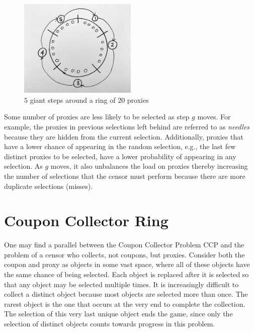 \begin{figure}[h!]
\centering
     \includegraphics[width=0.5\textwidth]{fig/giant_step_ring.png}
    \caption{$5$ giant steps around a ring of $20$ proxies}

    \label{fig:giantstepring}
\end{figure}

Some number of proxies are less likely to be selected as step $g$ moves. For example, the proxies in previous selections left behind are referred to as \emph{needles} because they are hidden from the current selection. Additionally, proxies that have a lower chance of appearing in the random selection, e.g., the last few distinct proxies to be selected, have a lower probability of appearing in any selection. As $g$ moves, it also unbalances the load on proxies thereby increasing the number of selections that the censor must perform because there are more duplicate selections (misses).
\section{Coupon Collector Ring}

One may find a parallel between the Coupon Collector Problem \ac{CCP} and the problem of a censor who collects, not coupons, but proxies. Consider both the coupon and proxy as objects in some vast space, where all of these objects have the same chance of being selected. Each object is replaced after it is selected so that any object may be selected multiple times. It is increasingly difficult to collect a distinct object because most objects are selected more than once. The rarest object is the one that occurs at the very end to complete the collection. The selection of this very last unique object ends the game, since only the selection of distinct objects counts towards progress in this problem.

